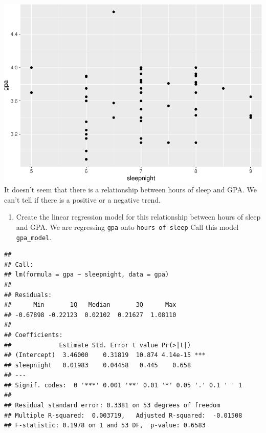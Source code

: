 \documentclass[]{article}
\newenvironment{Shaded}{\begin{snugshade}}{\end{snugshade}}
\newcommand{\DataTypeTok}[1]{\textcolor[rgb]{0.13,0.29,0.53}{#1}}
\newcommand{\KeywordTok}[1]{\textcolor[rgb]{0.13,0.29,0.53}{\textbf{#1}}}
\newcommand{\NormalTok}[1]{#1}
\newcommand{\OperatorTok}[1]{\textcolor[rgb]{0.81,0.36,0.00}{\textbf{#1}}}
\newcommand{\StringTok}[1]{\textcolor[rgb]{0.31,0.60,0.02}{#1}}
\providecommand{\tightlist}{%
  \setlength{\itemsep}{0pt}\setlength{\parskip}{0pt}}
\begin{document}
\includegraphics{lab-8-regression_files/figure-latex/unnamed-chunk-4-1.pdf}
It doesn't seem that there is a relationship between hours of sleep and
GPA. We can't tell if there is a positive or a negative trend.

\begin{enumerate}
\def\labelenumi{\arabic{enumi}.}
\setcounter{enumi}{2}
\tightlist
\item
  Create the linear regression model for this relationship between hours
  of sleep and GPA. We are regressing \texttt{gpa} onto
  \texttt{hours\ of\ sleep} Call this model \texttt{gpa\_model}.
\end{enumerate}

\begin{Shaded}
\end{Shaded}

\begin{verbatim}
## 
## Call:
## lm(formula = gpa ~ sleepnight, data = gpa)
## 
## Residuals:
##      Min       1Q   Median       3Q      Max 
## -0.67898 -0.22123  0.02102  0.21627  1.08110 
## 
## Coefficients:
##             Estimate Std. Error t value Pr(>|t|)    
## (Intercept)  3.46000    0.31819  10.874 4.14e-15 ***
## sleepnight   0.01983    0.04458   0.445    0.658    
## ---
## Signif. codes:  0 '***' 0.001 '**' 0.01 '*' 0.05 '.' 0.1 ' ' 1
## 
## Residual standard error: 0.3381 on 53 degrees of freedom
## Multiple R-squared:  0.003719,   Adjusted R-squared:  -0.01508 
## F-statistic: 0.1978 on 1 and 53 DF,  p-value: 0.6583
\end{verbatim}
\end{document}
